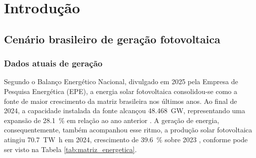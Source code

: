 \chapter{Introdução}
\label{cap:introducao}


\section{Cenário brasileiro de geração fotovoltaica}
\subsection{Dados atuais de geração}
\label{sec:cenario_brasileiro}

Segundo o Balanço Energético Nacional, divulgado em 2025 pela Empresa de
Pesquisa Energética (EPE), a energia solar fotovoltaica consolidou-se como a
fonte de maior crescimento da matriz brasileira nos últimos anos. Ao final de
2024, a capacidade instalada da fonte alcançou \SI{48,468}{\giga\watt},
representando uma expansão de \SI{28,1}{\percent} em relação ao ano anterior
\cite{EPE2025}. A geração de energia, consequentemente, também acompanhou esse ritmo, a produção solar fotovoltaica atingiu \SI{70,7}{\tera\watt\hour} em 2024, crescimento de
\SI{39,6}{\percent} sobre 2023 \cite{EPE2025}, conforme pode ser visto na Tabela \ref{tab:matriz_energetica}.

